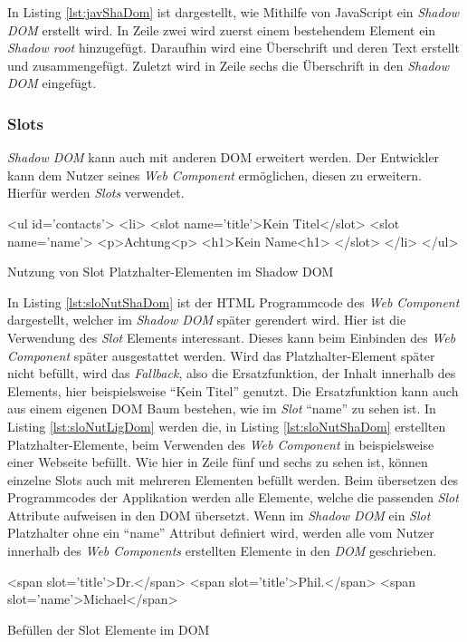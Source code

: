 \documentclass[12pt, paper=a4, bibtotoc, toc=listof, headsepline=true]{scrreprt}
\begin{document}
		In Listing \ref{lst:javShaDom} ist dargestellt, wie Mithilfe von JavaScript ein \emph{Shadow \ac{DOM}} erstellt wird. In Zeile zwei wird zuerst einem bestehendem Element ein \emph{Shadow root} hinzugefügt. Daraufhin wird eine Überschrift und deren Text erstellt und zusammengefügt. Zuletzt wird in Zeile sechs die Überschrift in den \emph{Shadow \ac{DOM}} eingefügt.
			\subsubsection{Slots}
			\emph{Shadow \ac{DOM}} kann auch mit anderen \ac{DOM} erweitert werden. Der Entwickler kann dem Nutzer seines \emph{Web Component} ermöglichen, diesen zu erweitern. Hierfür werden \emph{Slots} verwendet. 
			\begin{listing}
				\begin{HTMLcode*}{}
<ul id='contacts'>
   <li>
      <slot name='title'>Kein Titel</slot>
      <slot name='name'>
         <p>Achtung<p>
         <h1>Kein Name<h1>
      </slot>
   </li>
</ul>
				\end{HTMLcode*}
				\caption{Nutzung von Slot Platzhalter-Elementen im Shadow DOM}
				\label{lst:sloNutShaDom}
			\end{listing}
			In Listing \ref{lst:sloNutShaDom} ist der \ac{HTML} Programmcode des \emph{Web Component} dargestellt, welcher im \emph{Shadow \ac{DOM}} später gerendert wird. Hier ist die Verwendung des \emph{Slot} Elements interessant. Dieses kann beim Einbinden des \emph{Web Component} später ausgestattet werden. Wird das Platzhalter-Element später nicht befüllt, wird das \emph{Fallback}, also die Ersatzfunktion, der Inhalt innerhalb des Elements, hier beispielsweise \enquote{Kein Titel} genutzt. Die Ersatzfunktion kann auch aus einem eigenen \ac{DOM} Baum bestehen, wie im \emph{Slot} \enquote{name} zu sehen ist.\cite[vgl.]{Bidelman2016} In Listing \ref{lst:sloNutLigDom} werden die, in Listing \ref{lst:sloNutShaDom} erstellten Platzhalter-Elemente, beim Verwenden des \emph{Web Component} in beispielsweise einer Webseite befüllt. Wie hier in Zeile fünf und sechs zu sehen ist, können einzelne Slots auch mit mehreren Elementen befüllt werden. Beim übersetzen des Programmcodes der Applikation werden alle Elemente, welche die passenden \emph{Slot} Attribute aufweisen in den \ac{DOM} übersetzt. Wenn im \emph{Shadow \ac{DOM}} ein \emph{Slot} Platzhalter ohne ein \enquote{name} Attribut definiert wird, werden alle vom Nutzer innerhalb des \emph{Web Components} erstellten Elemente in den \emph{DOM} geschrieben.
			\begin{listing}
				\begin{HTMLcode*}{}
<span slot='title'>Dr.</span>
<span slot='title'>Phil.</span>
<span slot='name'>Michael</span>
				\end{HTMLcode*}
				\caption{Befüllen der Slot Elemente im DOM}
				\label{lst:sloNutLigDom}
			\end{listing}
\end{document}
